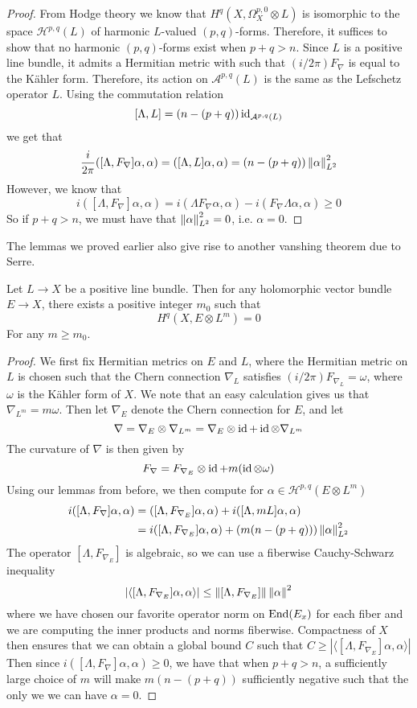 \begin{proof}
From Hodge theory we know that $H^q(X,\Omega_X^{p,0} \otimes L)$ is isomorphic
to the space $\mathcal{H}^{p,q}(L)$ of harmonic $L$-valued $(p,q)$-forms. Therefore,
it suffices to show that no harmonic $(p,q)$-forms exist when $p+q > n$. Since
$L$ is a positive line bundle, it admits a Hermitian metric with such that
$(i/2\pi)F_\nabla$ is equal to the K\"ahler form. Therefore, its action on
$\mathcal{A}^{p,q}(L)$ is the same as the Lefschetz operator $L$. Using the
commutation relation
\[
[\Lambda,L] = (n-(p+q))\operatorname{id}_{\mathcal{A}^{p,q}(L)}
\]
we get that
\[
\frac{i}{2\pi}([\Lambda,F_\nabla]\alpha,\alpha)
= ([\Lambda,L]\alpha,\alpha) = (n-(p+q))\left\lVert\alpha\right\rVert^2_{L^2}
\]
However, we know that
\[
i([\Lambda,F_\nabla]\alpha,\alpha) = i(\Lambda F_\nabla\alpha,\alpha)
- i(F_\nabla\Lambda\alpha,\alpha) \geq 0
\]
So if $p+q > n$, we must have that $\left\lVert\alpha\right\rVert^2_{L^2} = 0$, i.e. $\alpha = 0$.
\end{proof}
%
The lemmas we proved earlier also give rise to another vanshing theorem due to
Serre.
%
\begin{thm}
Let $L \to X$ be a positive line bundle. Then for any holomorphic vector bundle
$E \to X$, there exists a positive integer $m_0$ such that
\[
H^q(X,E \otimes L^m) = 0
\]
For any $m \geq m_0$.
\end{thm}
%
\begin{proof}
We first fix Hermitian metrics on $E$ and $L$, where the Hermitian metric on $L$ is
chosen such that the Chern connection $\nabla_L$ satisfies
$(i/2\pi)F_{\nabla_L} = \omega$, where $\omega$ is the K\"ahler form of $X$. We
note that an easy calculation gives us that $\nabla_{L^m} = m\omega$.
Then let $\nabla_E$ denote the Chern connection for $E$, and let
\[
\nabla = \nabla_E \otimes \nabla_{L^m} = \nabla_E \otimes \operatorname{id} + \operatorname{id} \otimes \nabla_{L^m}
\]
The curvature of $\nabla$ is then given by
\[
F_\nabla = F_{\nabla_E} \otimes \operatorname{id} + m(\operatorname{id} \otimes \omega)
\]
Using our lemmas from before, we then compute for
$\alpha \in \mathcal{H}^{p,q}(E \otimes L^m)$
\begin{align*}
i([\Lambda,F_\nabla]\alpha,\alpha) &= ([\Lambda,F_{\nabla_E}]\alpha,\alpha)
+ i([\Lambda,mL]\alpha,\alpha) \\
&= i([\Lambda,F_{\nabla_E}]\alpha,\alpha) + (m(n-(p+q)))\left\lVert\alpha\right\rVert^2_{L^2}
\end{align*}
The operator $[\Lambda,F_{\nabla_E}]$ is algebraic, so we can use a fiberwise
Cauchy-Schwarz inequality
\[
|\langle[\Lambda,F_{\nabla_E}]\alpha,\alpha\rangle|
\leq \left\lVert[\Lambda,F_{\nabla_E}]\right\rVert\left\lVert\alpha\right\rVert^2
\]
where we have chosen our favorite operator norm on $\operatorname{End}(E_x)$ for each fiber
and we are computing the inner products and norms fiberwise. Compactness of $X$
then ensures that we can obtain a global bound $C$ such that
$C \geq |\langle[\Lambda,F_{\nabla_E}]\alpha,\alpha\rangle|$
Then since
$i([\Lambda,F_\nabla]\alpha,\alpha) \geq 0$, we have that when $p+q > n$, a
sufficiently large choice of $m$ will make $m(n-(p+q))$ sufficiently negative
such that the only we we can have $\alpha = 0$.
\end{proof}
